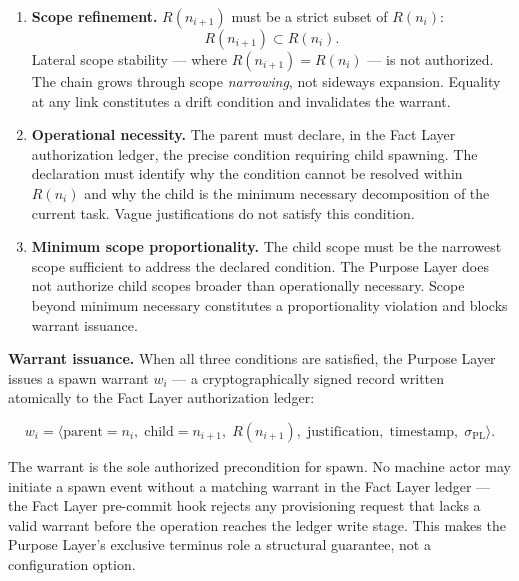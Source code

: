 \begin{enumerate}
    \item[(P1)] \textbf{Scope refinement.} $R(n_{i+1})$ must be a strict subset of $R(n_i)$:
    \begin{equation}
    R(n_{i+1}) \subset R(n_i).
    \label{eq:rs-scope-refinement}
    \end{equation}
    Lateral scope stability — where $R(n_{i+1}) = R(n_i)$ — is not authorized. The chain grows through scope \emph{narrowing}, not sideways expansion. Equality at any link constitutes a drift condition and invalidates the warrant.

    \item[(P2)] \textbf{Operational necessity.} The parent must declare, in the Fact Layer authorization ledger, the precise condition requiring child spawning. The declaration must identify why the condition cannot be resolved within $R(n_i)$ and why the child is the minimum necessary decomposition of the current task. Vague justifications do not satisfy this condition.

    \item[(P3)] \textbf{Minimum scope proportionality.} The child scope must be the narrowest scope sufficient to address the declared condition. The Purpose Layer does not authorize child scopes broader than operationally necessary. Scope beyond minimum necessary constitutes a proportionality violation and blocks warrant issuance.
\end{enumerate}

\medskip
\noindent\textbf{Warrant issuance.} When all three conditions are satisfied, the Purpose Layer issues a spawn warrant $w_i$ — a cryptographically signed record written atomically to the Fact Layer authorization ledger:

\begin{equation}
w_i = \bigl\langle
\text{parent}=n_i,\;
\text{child}=n_{i+1},\;
R(n_{i+1}),\;
\text{justification},\;
\text{timestamp},\;
\sigma_{\text{PL}}
\bigr\rangle .
\label{eq:spawn-warrant}
\end{equation}

The warrant is the sole authorized precondition for spawn. No machine actor may initiate a spawn event without a matching warrant in the Fact Layer ledger — the Fact Layer pre-commit hook rejects any provisioning request that lacks a valid warrant before the operation reaches the ledger write stage. This makes the Purpose Layer's exclusive terminus role a structural guarantee, not a configuration option.

